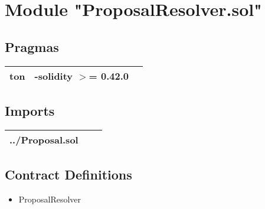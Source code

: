 
\section{Module "ProposalResolver.sol"}


\subsection{Pragmas}


\noindent\begin{tabular}{|l|l|p{5cm}|}\hline
ton & -solidity $>$= 0.42.0 &\\\hline
\end{tabular}


\subsection{Imports}


\noindent\begin{tabular}{|l|l|p{5cm}|}\hline
../Proposal.sol &\\\hline
\end{tabular}


\subsection{Contract Definitions}

\begin{itemize}
\item ProposalResolver
\end{itemize}
